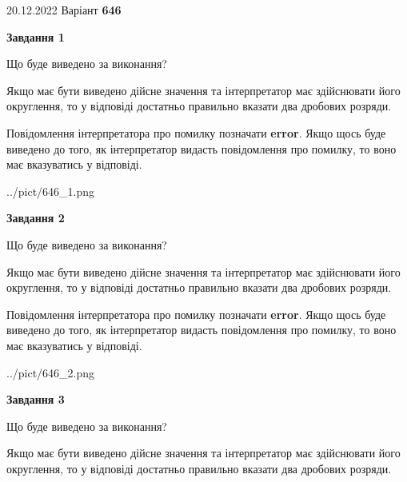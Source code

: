 \documentclass[12pt, ukrainian]{article}
\begin{document}
{20.12.2022 Варіант \No \textbf { 646 }\par}
{
\begin {Large}

{\begin {center}\textbf{Завдання 1}\end {center}}\par
Що буде виведено за виконання? \par

Якщо має бути виведено дійсне значення та інтерпретатор має здійснювати його округлення, 
то у відповіді достатньо правильно вказати два дробових розряди.

Повідомлення інтерпретатора про помилку позначати \textbf{error}.
Якщо щось буде виведено до того, як інтерпретатор видасть повідомлення про помилку, 
то воно має вказуватись у відповіді. \par

\begin{center}
	{../pict/646_1.png}
\end{center}
\newpage

{\begin {center}\textbf{Завдання 2}\end {center}}\par
Що буде виведено за виконання? \par

Якщо має бути виведено дійсне значення та інтерпретатор має здійснювати його округлення, 
то у відповіді достатньо правильно вказати два дробових розряди.

Повідомлення інтерпретатора про помилку позначати \textbf{error}.
Якщо щось буде виведено до того, як інтерпретатор видасть повідомлення про помилку, 
то воно має вказуватись у відповіді. \par

\begin{center}
	{../pict/646_2.png}
\end{center}
\newpage

{\begin {center}\textbf{Завдання 3}\end {center}}\par
Що буде виведено за виконання? \par

Якщо має бути виведено дійсне значення та інтерпретатор має здійснювати його округлення, 
то у відповіді достатньо правильно вказати два дробових розряди.


\end{Large}}
\end{document}

